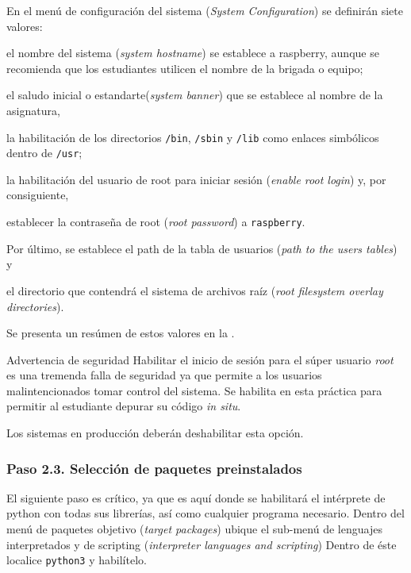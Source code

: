 En el menú de configuración del sistema (\emph{System Configuration}) se definirán siete valores:
\begin{enumerate*}[label=\alph*\rpar]
	\item el nombre del sistema (\emph{system hostname}) se establece a {raspberry}, aunque se recomienda que los estudiantes utilicen el nombre de la brigada o equipo;
	\item el saludo inicial o estandarte(\emph{system banner}) que se establece al nombre de la asignatura,
	\item la habilitación de los directorios
		\texttt{/bin},
		\texttt{/sbin} y
		\texttt{/lib}
		como enlaces simbólicos dentro de \texttt{/usr};
	\item la habilitación del usuario de root para iniciar sesión (\emph{enable root login})
	y, por consiguiente,
	\item establecer la contraseña de root (\emph{root password}) a \texttt{raspberry}.
	\item Por último, se establece el path de la tabla de usuarios (\emph{path to the users tables})
	y
	\item el directorio que contendrá el sistema de archivos raíz (\emph{root filesystem overlay directories}).
\end{enumerate*}
Se presenta un resúmen de estos valores en la .

\medskip{}

\begin{importantbox}{Advertencia de seguridad}
	Habilitar el inicio de sesión para el súper usuario \emph{root} es una tremenda falla de seguridad ya que permite a los usuarios malintencionados tomar control del sistema.
	Se habilita en esta práctica para permitir al estudiante depurar su código \emph{in situ}.

	Los sistemas en producción deberán deshabilitar esta opción.
\end{importantbox}



\subsubsection*{Paso 2.3. Selección de paquetes preinstalados}

El siguiente paso es crítico, ya que es aquí donde se habilitará el intérprete de python con todas sus librerías, así como cualquier programa necesario.
Dentro del menú de paquetes objetivo (\emph{target packages}) ubique el sub-menú de lenguajes interpretados y de scripting (\emph{interpreter languages and scripting})
Dentro de éste localice \texttt{python3} y habilítelo.

